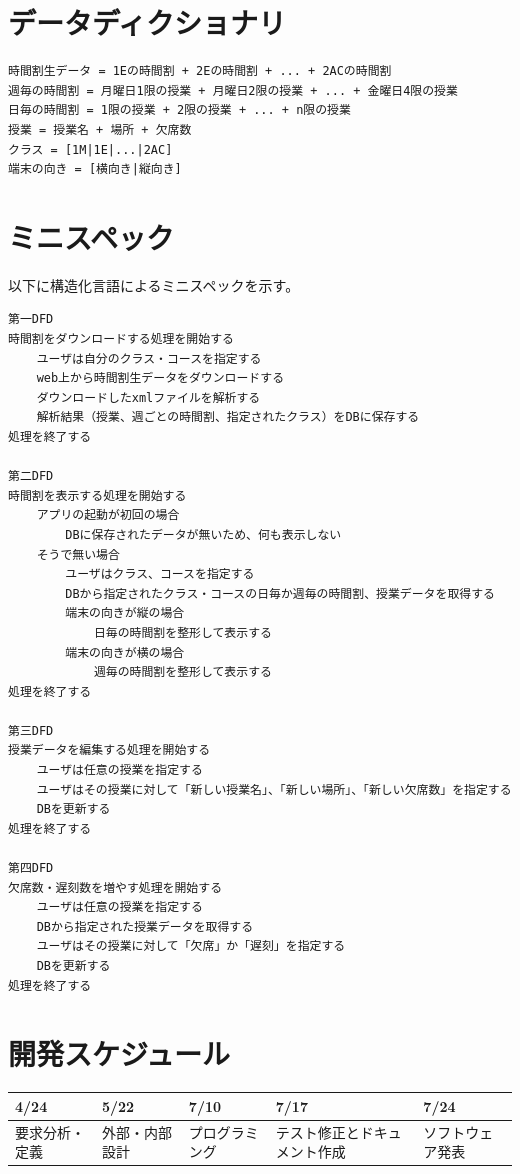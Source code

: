 \documentclass[a4paper,11pt]{jsarticle}
\begin{document}
\section{データディクショナリ}
\begin{verbatim}
時間割生データ = 1Eの時間割 + 2Eの時間割 + ... + 2ACの時間割
週毎の時間割 = 月曜日1限の授業 + 月曜日2限の授業 + ... + 金曜日4限の授業
日毎の時間割 = 1限の授業 + 2限の授業 + ... + n限の授業
授業 = 授業名 + 場所 + 欠席数
クラス = [1M|1E|...|2AC]
端末の向き = [横向き|縦向き]
\end{verbatim}

\section{ミニスペック}
以下に構造化言語によるミニスペックを示す。

\begin{verbatim}
第一DFD
時間割をダウンロードする処理を開始する
    ユーザは自分のクラス・コースを指定する
    web上から時間割生データをダウンロードする
    ダウンロードしたxmlファイルを解析する
    解析結果（授業、週ごとの時間割、指定されたクラス）をDBに保存する
処理を終了する

第二DFD
時間割を表示する処理を開始する
    アプリの起動が初回の場合
        DBに保存されたデータが無いため、何も表示しない
    そうで無い場合
        ユーザはクラス、コースを指定する
        DBから指定されたクラス・コースの日毎か週毎の時間割、授業データを取得する
        端末の向きが縦の場合
            日毎の時間割を整形して表示する
        端末の向きが横の場合
            週毎の時間割を整形して表示する
処理を終了する

第三DFD
授業データを編集する処理を開始する
    ユーザは任意の授業を指定する
    ユーザはその授業に対して「新しい授業名」、「新しい場所」、「新しい欠席数」を指定する
    DBを更新する
処理を終了する

第四DFD
欠席数・遅刻数を増やす処理を開始する
    ユーザは任意の授業を指定する
    DBから指定された授業データを取得する
    ユーザはその授業に対して「欠席」か「遅刻」を指定する
    DBを更新する
処理を終了する
\end{verbatim}

\section{開発スケジュール}

\begin{table}[H]
\begin{tabular}{|l|l|l|l|l|} \hline
4/24 & 5/22 & 7/10 & 7/17 & 7/24 \\ \hline
要求分析・定義 & 外部・内部設計 & プログラミング & テスト修正とドキュメント作成 & ソフトウェア発表 \\ \hline
\end{tabular}
\end{table}
\end{document}

